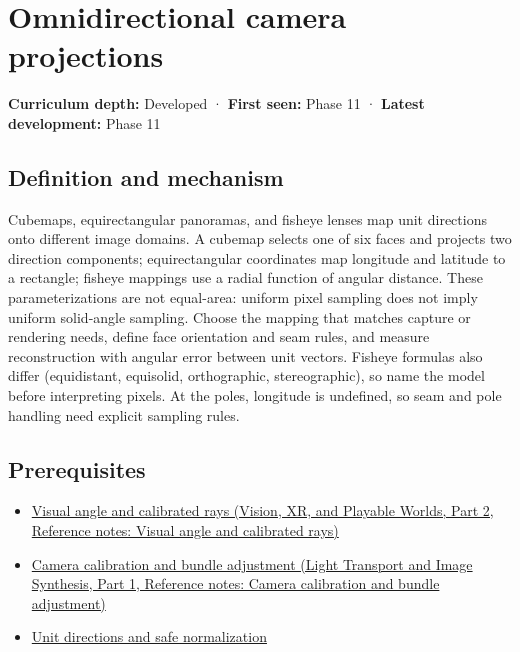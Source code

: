 \hypertarget{appendix-fc99ad39f351}{}\label{referencestart:appendix-fc99ad39f351}
\section{Omnidirectional camera projections}\label{appendix-fc99ad39f351-omnidirectional-camera-projections}

\hypertarget{appendix-fc99ad39f351-omnidirectional-camera-projections}{}

\textbf{Curriculum depth:} Developed · \textbf{First seen:} Phase 11 · \textbf{Latest development:} Phase 11

\begin{allmightroledefinition}

\subsection{Definition and mechanism}\label{appendix-fc99ad39f351-definition-and-mechanism}

\hypertarget{appendix-fc99ad39f351-definition-and-mechanism}{}

Cubemaps, equirectangular panoramas, and fisheye lenses map unit directions onto different image domains. A cubemap selects one of six faces and projects two direction components; equirectangular coordinates map longitude and latitude to a rectangle; fisheye mappings use a radial function of angular distance. These parameterizations are not equal-area: uniform pixel sampling does not imply uniform solid-angle sampling. Choose the mapping that matches capture or rendering needs, define face orientation and seam rules, and measure reconstruction with angular error between unit vectors. Fisheye formulas also differ (equidistant, equisolid, orthographic, stereographic), so name the model before interpreting pixels. At the poles, longitude is undefined, so seam and pole handling need explicit sampling rules.

\end{allmightroledefinition}

\subsection{Prerequisites}\label{appendix-fc99ad39f351-prerequisites}

\hypertarget{appendix-fc99ad39f351-prerequisites}{}

\begin{itemize}
\tightlist
\item
  \href{../07-Vision-XR-and-Playable-Worlds-P02/main.pdf\#nameddest=appendix-7d356c396d1a}{Visual angle and calibrated rays (Vision, XR, and Playable Worlds, Part 2, Reference notes: Visual angle and calibrated rays)}
\item
  \href{../04-Light-Transport-and-Image-Synthesis-P01/main.pdf\#nameddest=appendix-3ee9861904d5}{Camera calibration and bundle adjustment (Light Transport and Image Synthesis, Part 1, Reference notes: Camera calibration and bundle adjustment)}
\item
  \hyperref[appendix-f744e41b95b4]{Unit directions and safe normalization}
\end{itemize}

